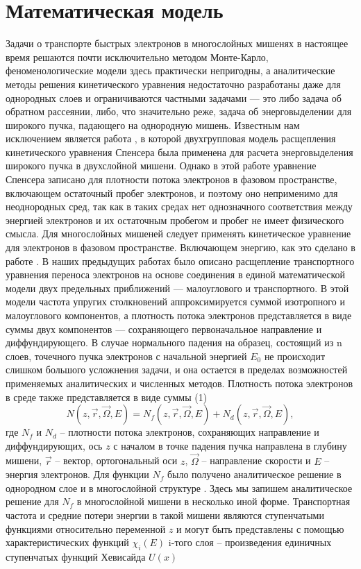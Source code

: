 \chapter{Математическая модель}
Задачи о транспорте быстрых электронов в многослойных мишенях в настоящее
время решаются почти исключительно методом Монте-Карло, феноменологические
модели здесь практически непригодны, а аналитические методы решения кинетического
уравнения недостаточно разработаны даже для однородных слоев и ограничиваются
частными задачами — это либо задача об обратном рассеянии, либо, что значительно
реже, задача об энерговыделении для широкого пучка, падающего на однородную
мишень. Известным нам исключением является работа \cite{zheng-ming}, в которой двухгрупповая
модель расщепления кинетического уравнения Спенсера была применена для расчета
энерговыделения широкого пучка в двухслойной мишени. Однако в этой работе
уравнение Спенсера записано для плотности потока электронов в фазовом пространстве,
включающем остаточный пробег электронов, и поэтому оно неприменимо для
неоднородных сред, так как в таких средах нет однозначного соответствия между
энергией электронов и их остаточным пробегом и пробег не имеет физического смысла.
Для многослойных мишеней следует применять кинетическое уравнение для электронов в
фазовом пространстве. Включающем энергию, как это сделано в работе \cite{smolar}.
В наших предыдущих работах \cite{mikheev,smolar1,smolar2} было описано расщепление транспортного
уравнения переноса электронов на основе соединения в единой математической модели
двух предельных приближений — малоуглового и транспортного. В этой модели частота
упругих столкновений аппроксимируется суммой изотропного и малоуглового
компонентов, а плотность потока электронов представляется в виде суммы двух
компонентов — сохраняющего первоначальное направление и диффундирующего.
В случае нормального падения на образец, состоящий из n слоев, точечного пучка
электронов с начальной энергией $E_0$ не происходит слишком большого усложнения
задачи, и она остается в пределах возможностей применяемых аналитических и
численных методов. Плотность потока электронов в среде также представляется в виде
суммы
(1)
\begin{equation}
N(z,\vec{r},\vec{\Omega},E)=N_f (z,\vec{r},\vec{\Omega},E)+N_d (z,\vec{r},\vec{\Omega},E),
\label{eq:1}
\end{equation}
где $N_f$ и $N_d$ – плотности потока электронов, сохраняющих направление и
диффундирующих, ось $z$ с началом в точке падения пучка направлена в глубину мишени,
$\vec{r}$ – вектор, ортогональный оси $z$, $\vec{\Omega}$ – направление скорости и $E$ – энергия электронов.
Для функции $N_f$ было получено аналитическое решение в однородном слое \cite{smolar2} и в
многослойной структуре \cite{smolar}. Здесь мы запишем аналитическое решение для $N_f$ в
многослойной мишени в несколько иной форме. Транспортная частота и средние потери
энергии в такой мишени являются ступенчатыми функциями относительно переменной $z$
и могут быть представлены с помощью характеристических функций $\chi_i(E)$ i-того слоя –
произведения единичных ступенчатых функций Хевисайда $U(x)$



